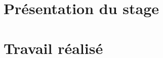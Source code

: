 \documentclass[11pt,french]{report}
\begin{document}






\chapter{Présentation du stage}

\chapter{Travail réalisé}
\end{document}
